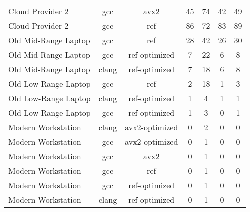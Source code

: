 \begin{table}[H]
\begin{tabularx}{\linewidth}{l c c c c c c}
            Cloud Provider 2 &                  gcc &                 avx2 &                   45 &                   74 &                   42 &                   49\\
            Cloud Provider 2 &                  gcc &                  ref &                   86 &                   72 &                   83 &                   89\\
        Old Mid-Range Laptop &                  gcc &                  ref &                   28 &                   42 &                   26 &                   30\\
        Old Mid-Range Laptop &                  gcc &        ref-optimized &                    7 &                   22 &                    6 &                    8\\
        Old Mid-Range Laptop &                clang &        ref-optimized &                    7 &                   18 &                    6 &                    8\\
        Old Low-Range Laptop &                  gcc &                  ref &                    2 &                   18 &                    1 &                    3\\
        Old Low-Range Laptop &                clang &        ref-optimized &                    1 &                    4 &                    1 &                    1\\
        Old Low-Range Laptop &                  gcc &        ref-optimized &                    1 &                    3 &                    0 &                    1\\
          Modern Workstation &                clang &       avx2-optimized &                    0 &                    2 &                    0 &                    0\\
          Modern Workstation &                  gcc &       avx2-optimized &                    0 &                    1 &                    0 &                    0\\
          Modern Workstation &                  gcc &                 avx2 &                    0 &                    1 &                    0 &                    0\\
          Modern Workstation &                  gcc &                  ref &                    0 &                    1 &                    0 &                    0\\
          Modern Workstation &                  gcc &        ref-optimized &                    0 &                    1 &                    0 &                    0\\
          Modern Workstation &                clang &        ref-optimized &                    0 &                    1 &                    0 &                    0\\
        \bottomrule
    \end{tabularx}
\end{table}